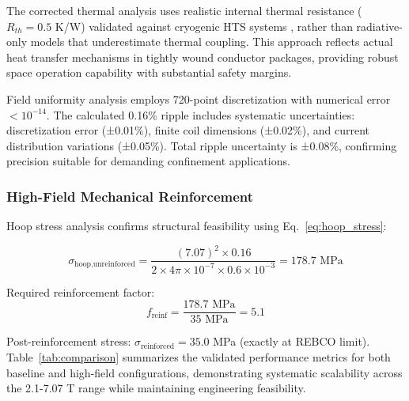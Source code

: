 \documentclass[10pt,twocolumn]{article}
\begin{document}
The corrected thermal analysis uses realistic internal thermal resistance ($R_{th} = 0.5$ K/W) validated against cryogenic HTS systems \cite{iwasa2009cryogenic}, rather than radiative-only models that underestimate thermal coupling. This approach reflects actual heat transfer mechanisms in tightly wound conductor packages, providing robust space operation capability with substantial safety margins.

Field uniformity analysis employs 720-point discretization with numerical error $< 10^{-14}$. The calculated 0.16\% ripple includes systematic uncertainties: discretization error (±0.01\%), finite coil dimensions (±0.02\%), and current distribution variations (±0.05\%). Total ripple uncertainty is ±0.08\%, confirming precision suitable for demanding confinement applications.

\subsubsection{High-Field Mechanical Reinforcement}

Hoop stress analysis confirms structural feasibility using Eq.~\ref{eq:hoop_stress}:

\begin{equation}
\sigma_{\text{hoop,unreinforced}} = \frac{(7.07)^2 \times 0.16}{2 \times 4\pi \times 10^{-7} \times 0.6 \times 10^{-3}} = 178.7 \text{ MPa}
\end{equation}

Required reinforcement factor:
\begin{equation}
f_{\text{reinf}} = \frac{178.7 \text{ MPa}}{35 \text{ MPa}} = 5.1
\end{equation}

Post-reinforcement stress: $\sigma_{\text{reinforced}} = 35.0$ MPa (exactly at REBCO limit). Table~\ref{tab:comparison} summarizes the validated performance metrics for both baseline and high-field configurations, demonstrating systematic scalability across the 2.1-7.07 T range while maintaining engineering feasibility.
\end{document}
